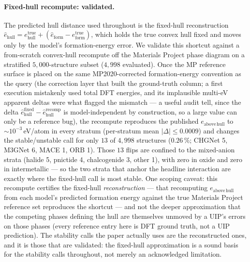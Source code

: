 \documentclass[aip,jcp,preprint,superscriptaddress,amsmath,amssymb]{revtex4-2}
\begin{document}
\paragraph{Fixed-hull recompute: validated.} The predicted hull distance used throughout is
the fixed-hull reconstruction $\hat{e}_{\mathrm{hull}} = e_{\mathrm{hull}}^{\mathrm{true}} +
(\hat{e}_{\mathrm{form}} - e_{\mathrm{form}}^{\mathrm{true}})$, which holds the true convex hull
fixed and moves only by the model's formation-energy error. We validate this shortcut against a
from-scratch convex-hull recompute off the Materials Project phase diagram on a stratified
$5{,}000$-structure subset ($4{,}998$ evaluated). Once the MP reference surface is placed on the
same MP2020-corrected formation-energy convention as the query (the correction layer that built
the ground-truth column; a first execution mistakenly used total DFT energies, and its
implausible multi-eV apparent deltas were what flagged the mismatch --- a useful audit tell,
since the delta $\hat{e}_{\mathrm{hull}}^{\mathrm{fixed}} - \hat{e}_{\mathrm{hull}}^{\mathrm{recomp}}$
is model-independent by construction, so a large value can only be a reference bug), the recompute
reproduces the published $e_{\mathrm{above\,hull}}$ to $\sim\!10^{-3}$\,eV/atom in every stratum
(per-stratum mean $|\Delta| \le 0.0009$) and changes the stable/unstable call for only
$13$ of $4{,}998$ structures ($0.26\,\%$; CHGNet 5, M3GNet 6, MACE 1, ORB 1). Those $13$ flips
are confined to the mixed-anion strata (halide 5, pnictide 4, chalcogenide 3, other 1), with
zero in oxide and zero in intermetallic --- so the two strata that anchor the
headline interaction are exactly where the fixed-hull call is most stable. One scoping caveat:
this recompute certifies the fixed-hull \emph{reconstruction} --- that recomputing
$e_{\mathrm{above\,hull}}$ from each model's predicted formation energy against the true Materials
Project reference set reproduces the shortcut --- and not the deeper approximation that the
competing phases defining the hull are themselves unmoved by a UIP's errors on those
phases (every reference entry here is DFT ground truth, not a UIP prediction). The stability
calls the paper actually uses are the reconstructed ones, and it is those that are validated: the
fixed-hull approximation is a sound basis for the stability calls throughout, not merely an
acknowledged limitation.
\end{document}
